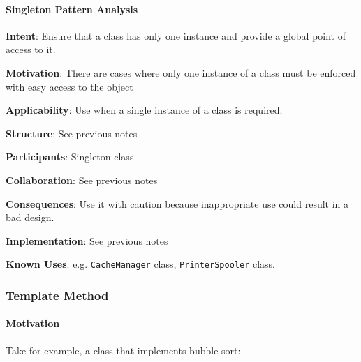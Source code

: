 \documentclass[]{article}
\let\oldparagraph\paragraph
\renewcommand{\paragraph}[1]{\oldparagraph{#1}\mbox{}}
\begin{document}
\hypertarget{singleton-pattern-analysis}{%
\paragraph{Singleton Pattern
Analysis}\label{singleton-pattern-analysis}}

\textbf{Intent}: Ensure that a class has only one instance and provide a
global point of access to it.

\textbf{Motivation}: There are cases where only one instance of a class
must be enforced with easy access to the object

\textbf{Applicability}: Use when a single instance of a class is
required.

\textbf{Structure}: See previous notes

\textbf{Participants}: Singleton class

\textbf{Collaboration}: See previous notes

\textbf{Consequences}: Use it with caution because inappropriate use
could result in a bad design.

\textbf{Implementation}: See previous notes

\textbf{Known Uses}: e.g. \texttt{CacheManager} class,
\texttt{PrinterSpooler} class.

\hypertarget{template-method}{%
\subsubsection{Template Method}\label{template-method}}

\hypertarget{motivation}{%
\paragraph{Motivation}\label{motivation}}

Take for example, a class that implements bubble sort:
\end{document}
